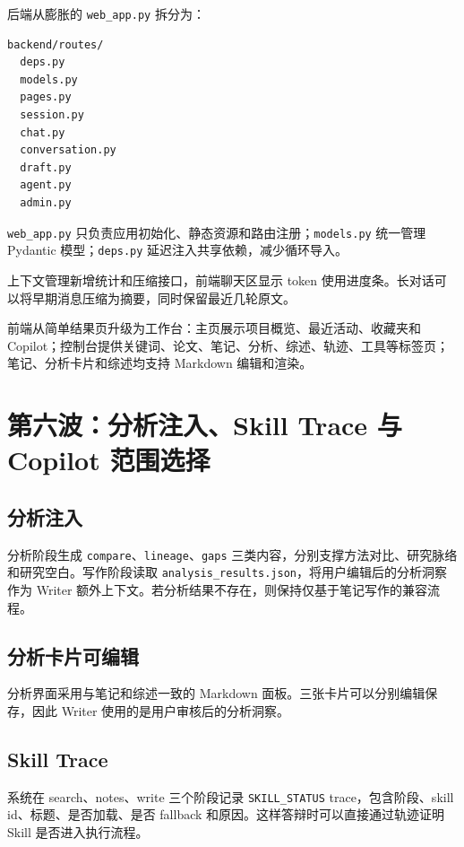 \documentclass[12pt,a4paper,onecolumn]{ctexart}
\newcommand{\code}[1]{\texttt{#1}}
\begin{document}
后端从膨胀的 \code{web\_app.py} 拆分为：

\begin{verbatim}
backend/routes/
  deps.py
  models.py
  pages.py
  session.py
  chat.py
  conversation.py
  draft.py
  agent.py
  admin.py
\end{verbatim}

\code{web\_app.py} 只负责应用初始化、静态资源和路由注册；\code{models.py} 统一管理 Pydantic 模型；\code{deps.py} 延迟注入共享依赖，减少循环导入。

上下文管理新增统计和压缩接口，前端聊天区显示 token 使用进度条。长对话可以将早期消息压缩为摘要，同时保留最近几轮原文。

前端从简单结果页升级为工作台：主页展示项目概览、最近活动、收藏夹和 Copilot；控制台提供关键词、论文、笔记、分析、综述、轨迹、工具等标签页；笔记、分析卡片和综述均支持 Markdown 编辑和渲染。

\section{第六波：分析注入、Skill Trace 与 Copilot 范围选择}

\subsection{分析注入}

分析阶段生成 \code{compare}、\code{lineage}、\code{gaps} 三类内容，分别支撑方法对比、研究脉络和研究空白。写作阶段读取 \code{analysis\_results.json}，将用户编辑后的分析洞察作为 Writer 额外上下文。若分析结果不存在，则保持仅基于笔记写作的兼容流程。

\subsection{分析卡片可编辑}

分析界面采用与笔记和综述一致的 Markdown 面板。三张卡片可以分别编辑保存，因此 Writer 使用的是用户审核后的分析洞察。

\subsection{Skill Trace}

系统在 search、notes、write 三个阶段记录 \code{SKILL\_STATUS} trace，包含阶段、skill id、标题、是否加载、是否 fallback 和原因。这样答辩时可以直接通过轨迹证明 Skill 是否进入执行流程。
\end{document}
